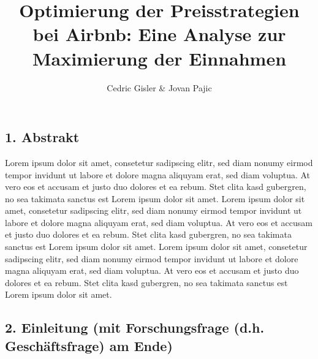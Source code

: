 \documentclass[
  journal,
]{IEEEtran}%
\title{Optimierung der Preisstrategien bei Airbnb: Eine Analyse zur
Maximierung der Einnahmen}
\author{
Cedric Gisler \& Jovan Pajic%

}
\begin{document}


\maketitle


%

\ifdefined\Shaded\renewenvironment{Shaded}{\begin{tcolorbox}[frame hidden, boxrule=0pt, sharp corners, enhanced, breakable, interior hidden, borderline west={3pt}{0pt}{shadecolor}]}{\end{tcolorbox}}\fi

\hypertarget{abstrakt}{%
\subsection{1. Abstrakt}\label{abstrakt}}

Lorem ipsum dolor sit amet, consetetur sadipscing elitr, sed diam nonumy
eirmod tempor invidunt ut labore et dolore magna aliquyam erat, sed diam
voluptua. At vero eos et accusam et justo duo dolores et ea rebum. Stet
clita kasd gubergren, no sea takimata sanctus est Lorem ipsum dolor sit
amet. Lorem ipsum dolor sit amet, consetetur sadipscing elitr, sed diam
nonumy eirmod tempor invidunt ut labore et dolore magna aliquyam erat,
sed diam voluptua. At vero eos et accusam et justo duo dolores et ea
rebum. Stet clita kasd gubergren, no sea takimata sanctus est Lorem
ipsum dolor sit amet. Lorem ipsum dolor sit amet, consetetur sadipscing
elitr, sed diam nonumy eirmod tempor invidunt ut labore et dolore magna
aliquyam erat, sed diam voluptua. At vero eos et accusam et justo duo
dolores et ea rebum. Stet clita kasd gubergren, no sea takimata sanctus
est Lorem ipsum dolor sit amet.

\hypertarget{einleitung-mit-forschungsfrage-d.h.-geschuxe4ftsfrage-am-ende}{%
\subsection{2. Einleitung (mit Forschungsfrage (d.h. Geschäftsfrage) am
Ende)}\label{einleitung-mit-forschungsfrage-d.h.-geschuxe4ftsfrage-am-ende}}
\end{document}
